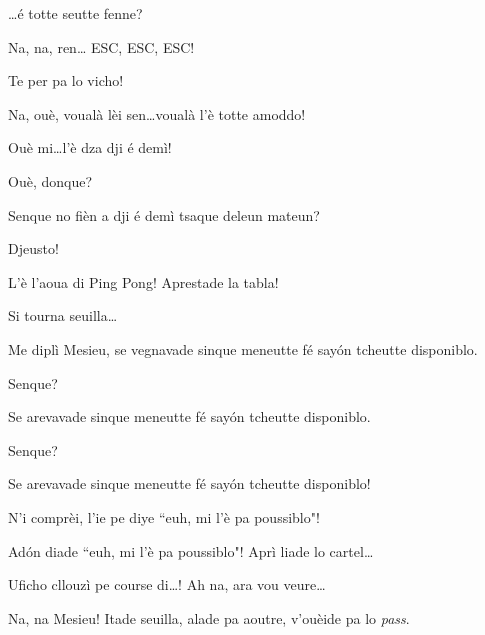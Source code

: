 \begin{drama}
\Treisouspeaks{} \ldots é totte seutte fenne?

\Tuenospeaks Na, na, ren\ldots {} ESC, ESC, ESC!

\Treisouspeaks Te per pa lo vicho!

\Tuenospeaks{} Na, ouè, voualà lèi sen\ldots voualà l'è totte amoddo!


\Treisouspeaks Ouè mi\ldots l'è dza dji é demì!

\Richardspeaks Ouè, donque?

\Treisouspeaks{} Senque no fièn a dji é demì tsaque deleun mateun?

\Tcheuttespeaks Djeusto!

\Treisouspeaks L’è l’aoua di Ping Pong! Aprestade la tabla!
 




\Genespeaks Si tourna seuilla\ldots

\Sandrinospeaks Me diplì Mesieu, se vegnavade sinque meneutte fé say\'on tcheutte disponiblo.

\Genespeaks Senque?

\Sandrinospeaks Se arevavade sinque meneutte fé say\'on tcheutte disponiblo.

\Genespeaks Senque?

\Sandrinospeaks{} Se arevavade sinque meneutte fé say\'on tcheutte disponiblo!

\Genespeaks{} N'i comprèi, l'ie pe diye ``euh, mi l'è pa poussiblo"!

\Sandrinospeaks Ad\'on diade ``euh, mi l'è pa poussiblo"! Aprì liade lo cartel\ldots

\Genespeaks{} Uficho cllouzì pe course di\ldots! Ah na, ara vou veure\ldots


\Sandrinospeaks Na, na Mesieu! Itade seuilla, alade pa aoutre, v'ouèide pa lo \textit{pass}. 


\end{drama}
